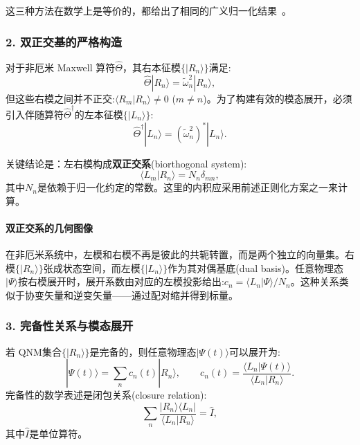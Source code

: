 这三种方法在数学上是等价的，都给出了相同的广义归一化结果~\cite{kristensen2015qnm,sauvan2013qnm}。

\subsubsection*{2. 双正交基的严格构造}

对于非厄米 Maxwell 算符$\hat{\Theta}$，其右本征模$\{|R_n\rangle\}$满足:
\begin{equation}
\hat{\Theta}|R_n\rangle = \tilde{\omega}_n^2 |R_n\rangle,
\end{equation}
但这些右模之间并不正交:$\langle R_m|R_n\rangle \neq 0$ ($m\neq n$)。为了构建有效的模态展开，必须引入伴随算符$\hat{\Theta}^\dagger$的左本征模$\{|L_n\rangle\}$:
\begin{equation}
\hat{\Theta}^\dagger|L_n\rangle = (\tilde{\omega}_n^2)^* |L_n\rangle.
\label{eq:left_eigenmode_def}
\end{equation}

关键结论是：左右模构成\textbf{双正交系}(biorthogonal system):
\begin{equation}
\langle L_m|R_n\rangle = N_n \delta_{mn},
\label{eq:biorthogonality_relation}
\end{equation}
其中$N_n$是依赖于归一化约定的常数。这里的内积应采用前述正则化方案之一来计算。

\paragraph{双正交系的几何图像} 在非厄米系统中，左模和右模不再是彼此的共轭转置，而是两个独立的向量集。右模$\{|R_n\rangle\}$张成状态空间，而左模$\{|L_n\rangle\}$作为其对偶基底(dual basis)。任意物理态$|\Psi\rangle$按右模展开时，展开系数由对应的左模投影给出:$c_n=\langle L_n|\Psi\rangle/N_n$。这种关系类似于协变矢量和逆变矢量——通过配对缩并得到标量。

\subsubsection*{3. 完备性关系与模态展开}

若 QNM集合$\{|R_n\rangle\}$是完备的，则任意物理态$|\Psi(t)\rangle$可以展开为:
\begin{equation}
|\Psi(t)\rangle = \sum_n c_n(t) |R_n\rangle, \qquad c_n(t) = \frac{\langle L_n|\Psi(t)\rangle}{\langle L_n|R_n\rangle}.
\label{eq:qnm_complete_expansion}
\end{equation}
完备性的数学表述是闭包关系(closure relation):
\begin{equation}
\sum_n \frac{|R_n\rangle\langle L_n|}{\langle L_n|R_n\rangle} = \hat{I},
\label{eq:closure_relation}
\end{equation}
其中$\hat{I}$是单位算符。

